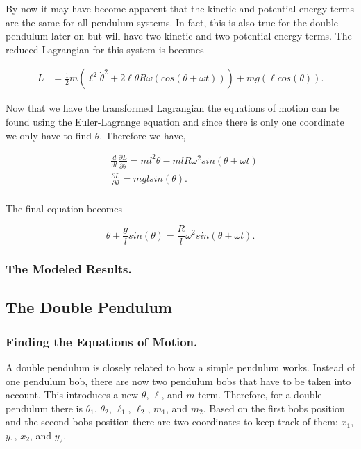 \documentclass[runningheads]{llncs}
\begin{document}
By now it may have become apparent that the kinetic and potential energy terms are the same for all pendulum systems. In fact, this is also true for the double pendulum later on but will have two kinetic and two potential energy terms. The reduced Lagrangian for this system is becomes

\begin{align*}
L &= \frac{1}{2}m(\ell^{2} \dot{\theta}^{2} + 2\ell \dot{\theta}R\omega(cos(\theta + \omega t))) + mg(\ell cos(\theta)).
\end{align*}


Now that we have the transformed Lagrangian the equations of motion can be found using the Euler-Lagrange equation and since there is only one coordinate we only have to find $\theta$. Therefore we have,


\begin{align*}
&\frac{d}{dt} \frac{\partial L}{\partial \dot{\theta}} = ml^{2}\ddot{\theta} -ml R\omega^{2}sin(\theta + \omega t)\\
& \frac{\partial L}{\partial \theta} =  mglsin(\theta). \\
\end{align*}

\noindent
The final equation becomes

$$
\ddot{\theta} + \frac{g}{l}sin(\theta) = \frac{R}{l}\omega^{2}sin(\theta + \omega t).
$$

\subsubsection{The Modeled Results.}


%
%
\subsection{The Double Pendulum}



\subsubsection{Finding the Equations of Motion.}

A double pendulum is closely related to how a simple pendulum works. Instead of one pendulum bob, there are now two pendulum bobs that have to be taken into account. This introduces a new $\theta$, $\ell$, and $m$ term. Therefore, for a double pendulum there is $\theta_{1}$, $\theta_{2}$, $\ell_{1}$, $\ell_{2}$, $m_{1}$, and $m_{2}$. Based on the first bobs position and the second bobs position there are two coordinates to keep track of them; $x_{1}$, $y_{1}$, $x_{2}$, and $y_{2}$. \\
\end{document}
